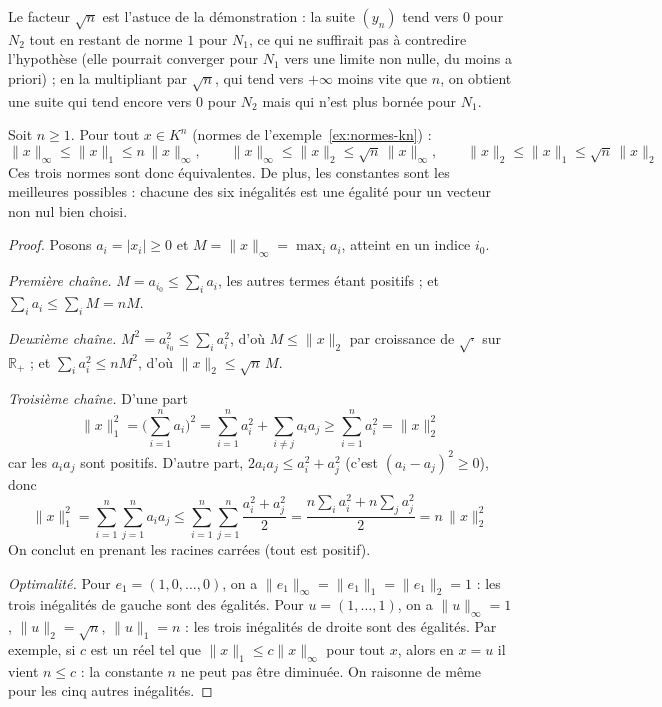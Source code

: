 \begin{remarque}
Le facteur $\sqrt n$ est l'astuce de la démonstration : la suite $(y_n)$ tend vers $0$ pour $N_2$ tout en restant de norme $1$ pour $N_1$, ce qui ne suffirait pas à contredire l'hypothèse (elle pourrait converger pour $N_1$ vers une limite non nulle, du moins a priori) ; en la multipliant par $\sqrt n$, qui tend vers $+\infty$ moins vite que $n$, on obtient une suite qui tend encore vers $0$ pour $N_2$ mais qui n'est plus bornée pour $N_1$.
\end{remarque}

\begin{exemple}
\label{ex:comparaison-normes-kn}
Soit $n\geq 1$. Pour tout $x\in K^n$ (normes de l'exemple~\ref{ex:normes-kn}) :
\[\|x\|_\infty\leq\|x\|_1\leq n\,\|x\|_\infty,\qquad \|x\|_\infty\leq\|x\|_2\leq\sqrt n\,\|x\|_\infty,\qquad \|x\|_2\leq\|x\|_1\leq\sqrt n\,\|x\|_2\]
Ces trois normes sont donc équivalentes. De plus, les constantes sont les meilleures possibles : chacune des six inégalités est une égalité pour un vecteur non nul bien choisi.
\end{exemple}

\begin{proof}
Posons $a_i=|x_i|\geq 0$ et $M=\|x\|_\infty=\max_i a_i$, atteint en un indice $i_0$.

\emph{Première chaîne.} $M=a_{i_0}\leq\sum_{i}a_i$, les autres termes étant positifs ; et $\sum_i a_i\leq\sum_i M=nM$.

\emph{Deuxième chaîne.} $M^2=a_{i_0}^2\leq\sum_i a_i^2$, d'où $M\leq\|x\|_2$ par croissance de $\sqrt{\cdot}$ sur $\mathbb{R}_+$ ; et $\sum_i a_i^2\leq nM^2$, d'où $\|x\|_2\leq\sqrt n\,M$.

\emph{Troisième chaîne.} D'une part
\[\|x\|_1^2 = \Big(\sum_{i=1}^n a_i\Big)^2 = \sum_{i=1}^n a_i^2 + \sum_{i\neq j}a_ia_j \geq \sum_{i=1}^n a_i^2 = \|x\|_2^2\]
car les $a_ia_j$ sont positifs. D'autre part, $2a_ia_j\leq a_i^2+a_j^2$ (c'est $(a_i-a_j)^2\geq 0$), donc
\[\|x\|_1^2 = \sum_{i=1}^n\sum_{j=1}^n a_ia_j \leq \sum_{i=1}^n\sum_{j=1}^n\frac{a_i^2+a_j^2}{2} = \frac{n\sum_i a_i^2+n\sum_j a_j^2}{2} = n\,\|x\|_2^2\]
On conclut en prenant les racines carrées (tout est positif).

\emph{Optimalité.} Pour $e_1=(1,0,\dots,0)$, on a $\|e_1\|_\infty=\|e_1\|_1=\|e_1\|_2=1$ : les trois inégalités de gauche sont des égalités. Pour $u=(1,\dots,1)$, on a $\|u\|_\infty=1$, $\|u\|_2=\sqrt n$, $\|u\|_1=n$ : les trois inégalités de droite sont des égalités. Par exemple, si $c$ est un réel tel que $\|x\|_1\leq c\|x\|_\infty$ pour tout $x$, alors en $x=u$ il vient $n\leq c$ : la constante $n$ ne peut pas être diminuée. On raisonne de même pour les cinq autres inégalités.
\end{proof}

